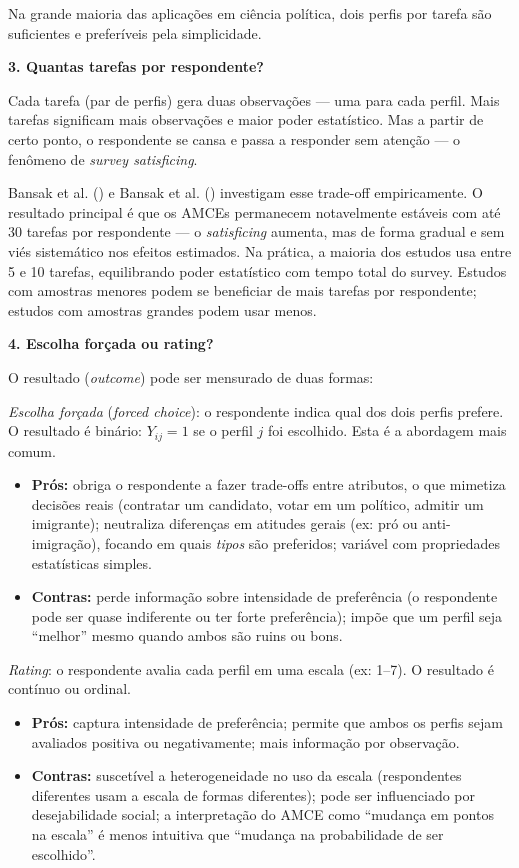 \documentclass[
]{article}
\providecommand{\tightlist}{%
  \setlength{\itemsep}{0pt}\setlength{\parskip}{0pt}}
\begin{document}
Na grande maioria das aplicações em ciência política, dois perfis por tarefa são suficientes e preferíveis pela simplicidade.

\textbf{3. Quantas tarefas por respondente?}

Cada tarefa (par de perfis) gera duas observações --- uma para cada perfil. Mais tarefas significam mais observações e maior poder estatístico. Mas a partir de certo ponto, o respondente se cansa e passa a responder sem atenção --- o fenômeno de \emph{survey satisficing}.

Bansak et al. () e Bansak et al. () investigam esse trade-off empiricamente. O resultado principal é que os AMCEs permanecem notavelmente estáveis com até 30 tarefas por respondente --- o \emph{satisficing} aumenta, mas de forma gradual e sem viés sistemático nos efeitos estimados. Na prática, a maioria dos estudos usa entre 5 e 10 tarefas, equilibrando poder estatístico com tempo total do survey. Estudos com amostras menores podem se beneficiar de mais tarefas por respondente; estudos com amostras grandes podem usar menos.

\textbf{4. Escolha forçada ou rating?}

O resultado (\emph{outcome}) pode ser mensurado de duas formas:

\emph{Escolha forçada} (\emph{forced choice}): o respondente indica qual dos dois perfis prefere. O resultado é binário: \(Y_{ij} = 1\) se o perfil \(j\) foi escolhido. Esta é a abordagem mais comum.

\begin{itemize}
\tightlist
\item
  \textbf{Prós:} obriga o respondente a fazer trade-offs entre atributos, o que mimetiza decisões reais (contratar um candidato, votar em um político, admitir um imigrante); neutraliza diferenças em atitudes gerais (ex: pró ou anti-imigração), focando em quais \emph{tipos} são preferidos; variável com propriedades estatísticas simples.
\item
  \textbf{Contras:} perde informação sobre intensidade de preferência (o respondente pode ser quase indiferente ou ter forte preferência); impõe que um perfil seja ``melhor'' mesmo quando ambos são ruins ou bons.
\end{itemize}

\emph{Rating}: o respondente avalia cada perfil em uma escala (ex: 1--7). O resultado é contínuo ou ordinal.

\begin{itemize}
\tightlist
\item
  \textbf{Prós:} captura intensidade de preferência; permite que ambos os perfis sejam avaliados positiva ou negativamente; mais informação por observação.
\item
  \textbf{Contras:} suscetível a heterogeneidade no uso da escala (respondentes diferentes usam a escala de formas diferentes); pode ser influenciado por desejabilidade social; a interpretação do AMCE como ``mudança em pontos na escala'' é menos intuitiva que ``mudança na probabilidade de ser escolhido''.
\end{itemize}
\end{document}
